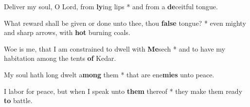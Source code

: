 \begin{multicols}{2}
	Deliver my soul, O Lord, from \textbf{ly}ing lips * and from a \textbf{de}ceitful tongue.
	
	What reward shall be given or done unto thee, thou \textbf{false} tongue? * even mighty and sharp arrows, with \textbf{hot} burning coals.
	
	Woe is me, that I am constrained to dwell with \textbf{Me}sech * and to have my habitation among the tents \textbf{of} Kedar.
	
	My soul hath long dwelt a\textbf{mong} them * that are ene\textbf{mies} unto peace.
	
	I labor for peace, but when I speak unto \textbf{them} thereof * they make them ready \textbf{to} battle.
\end{multicols}